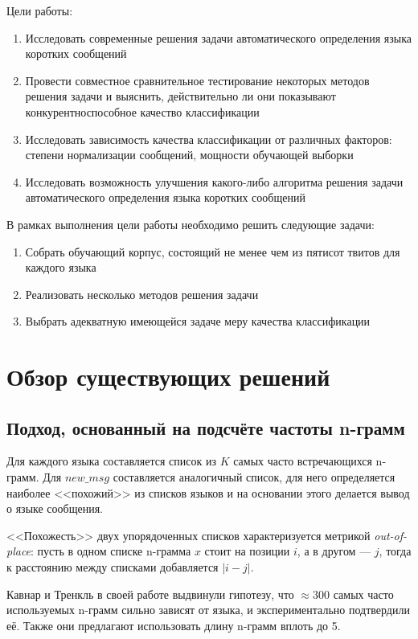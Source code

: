 \documentclass[a4paper, 14pt]{article}
\begin{document}
		
		Цели работы:
		\begin{enumerate}
			\item Исследовать современные решения задачи автоматического определения языка коротких сообщений
			\item Провести совместное сравнительное тестирование некоторых методов решения задачи и выяснить, действительно ли они показывают
			конкурентноспособное качество классификации
			\item Исследовать зависимость качества классификации от различных факторов: степени нормализации сообщений, мощности обучающей 
			выборки
			\item Исследовать возможность улучшения какого-либо алгоритма решения задачи автоматического определения языка коротких сообщений	
		\end{enumerate}
		В рамках выполнения цели работы необходимо решить следующие задачи:
		\begin{enumerate}
			\item Собрать обучающий корпус, состоящий не менее чем из пятисот твитов для каждого языка
			\item Реализовать несколько методов решения задачи
			\item Выбрать адекватную имеющейся задаче меру качества классификации
		\end{enumerate}

\pagebreak

\section{Обзор существующих решений}
		\subsection{Подход, основанный на подсчёте частоты n-грамм}
		Для каждого языка составляется список из $K$ самых часто встречающихся n-грамм. Для $new\_msg$ составляется аналогичный список, для него
		определяется наиболее <<похожий>> из списков языков
		и на основании этого делается вывод о языке сообщения. 
		
		<<Похожесть>> двух упорядоченных списков характеризуется метрикой \textit{out-of-place}: 
		пусть в одном списке n-грамма $x$ стоит на позиции $i$, а в другом \nolinebreak --- $j$, тогда к расстоянию между списками добавляется $|i - j|$.
		
		
		Кавнар и Тренкль в своей работе \cite{canvar} выдвинули гипотезу, что $ \approx 300$ самых часто используемых n-грамм сильно зависят
		от языка, и экспериментально подтвердили её. Также они предлагают использовать длину n-грамм вплоть до 5.
		
\end{document}

